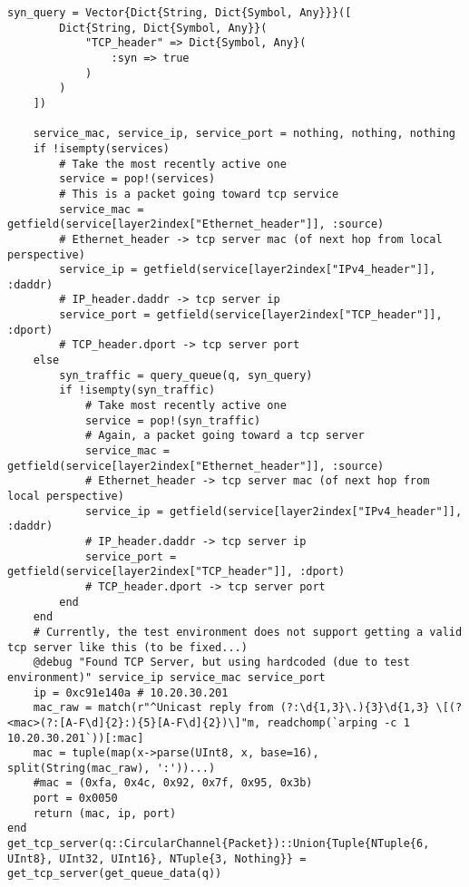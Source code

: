 \begin{lstlisting}[language=JuliaLocal, style=julia]
    syn_query = Vector{Dict{String, Dict{Symbol, Any}}}([
        Dict{String, Dict{Symbol, Any}}(
            "TCP_header" => Dict{Symbol, Any}(
                :syn => true
            )
        )
    ])

    service_mac, service_ip, service_port = nothing, nothing, nothing
    if !isempty(services)
        # Take the most recently active one
        service = pop!(services)
        # This is a packet going toward tcp service
        service_mac = getfield(service[layer2index["Ethernet_header"]], :source)
        # Ethernet_header -> tcp server mac (of next hop from local perspective)
        service_ip = getfield(service[layer2index["IPv4_header"]], :daddr)
        # IP_header.daddr -> tcp server ip
        service_port = getfield(service[layer2index["TCP_header"]], :dport)
        # TCP_header.dport -> tcp server port
    else
        syn_traffic = query_queue(q, syn_query)
        if !isempty(syn_traffic)
            # Take most recently active one
            service = pop!(syn_traffic)
            # Again, a packet going toward a tcp server
            service_mac = getfield(service[layer2index["Ethernet_header"]], :source)
            # Ethernet_header -> tcp server mac (of next hop from local perspective)
            service_ip = getfield(service[layer2index["IPv4_header"]], :daddr)
            # IP_header.daddr -> tcp server ip
            service_port = getfield(service[layer2index["TCP_header"]], :dport)
            # TCP_header.dport -> tcp server port
        end
    end
    # Currently, the test environment does not support getting a valid tcp server like this (to be fixed...)
    @debug "Found TCP Server, but using hardcoded (due to test environment)" service_ip service_mac service_port
    ip = 0xc91e140a # 10.20.30.201
    mac_raw = match(r"^Unicast reply from (?:\d{1,3}\.){3}\d{1,3} \[(?<mac>(?:[A-F\d]{2}:){5}[A-F\d]{2})\]"m, readchomp(`arping -c 1 10.20.30.201`))[:mac]
    mac = tuple(map(x->parse(UInt8, x, base=16), split(String(mac_raw), ':'))...)
    #mac = (0xfa, 0x4c, 0x92, 0x7f, 0x95, 0x3b)
    port = 0x0050
    return (mac, ip, port)
end
get_tcp_server(q::CircularChannel{Packet})::Union{Tuple{NTuple{6, UInt8}, UInt32, UInt16}, NTuple{3, Nothing}} = get_tcp_server(get_queue_data(q))


\end{lstlisting}
